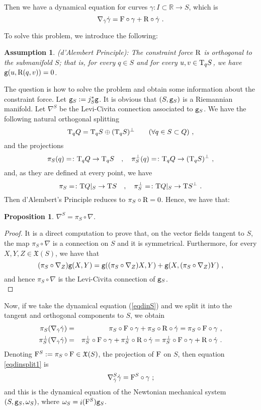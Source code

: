 \documentclass[12pt]{report}
\newtheorem{prop}[teor]{Proposition}
\newtheorem{assump}[teor]{Assumption}
\def\beq{\begin{equation}}
\def\eeq{\end{equation}}
\def\bea{\begin{eqnarray}}
\def\eea{\end{eqnarray}}
\def\qed{\ifvmode\removelastskip\fi
{\unskip\nobreak\hfil\penalty50\hbox{}\nobreak\hfil
\hbox{\vrule height1.2ex width1.2ex}\parfillskip=0pt
\finalhyphendemerits=0 \par\smallskip}}
\def\vf{\mathfrak X}
\def\Real{\mathbb{R}}
\def\Tan{{\rm T}}
\def\inn{\mathop{i}\nolimits}
\begin{document}
Then we have a dynamical equation for curves
$\gamma\colon I\subset\Real\to S$, which is
\beq
\nabla_{\dot\gamma}\dot\gamma ={\rm F}\circ\gamma+{\rm R}\circ\dot\gamma \ .
\label{eqdinS}
\eeq

To solve this problem, we introduce the following:

\begin{assump}
{\rm (d'Alembert Principle}):
The constraint force ${\rm R}$ is orthogonal to the submanifold $S$;
that is, for every $q\in S$ and for every $ u,v\in\Tan_qS$, we have  ${\tt g}(u,{\rm R}(q,v))=0$.
\end{assump}

The question is how to solve the problem and obtain some information about the constraint force.
Let ${\tt g}_S:=j_S^*{\tt g}$. It is obvious that $(S,{\tt g}_S)$ is a Riemannian manifold.
Let $\nabla^S$ be the Levi-Civita connection associated to ${\tt g}_S$.
We have the following natural orthogonal splitting 
$$
\Tan_qQ=\Tan_qS\oplus (\Tan_qS)^\perp \qquad (\forall q\in S\subset Q) \ ,
$$
and the projections
$$
\pi_S(q)=\colon \Tan_qQ\rightarrow\Tan_qS
\quad , \quad
\pi^\perp_S(q)=\colon \Tan_qQ\rightarrow (\Tan_qS)^\perp \ ,
$$
and, as they are defined at every point, we have
$$
\pi_S=\colon \Tan Q\vert_S\rightarrow\Tan S
\quad , \quad
\pi^\perp_S=\colon \Tan Q\vert_S\rightarrow \Tan S^\perp \ .
$$
Then d'Alembert's Principle reduces to $\pi_S\circ{\rm R}=0$.
Hence, we have that:

\begin{prop}
$\nabla^S=\pi_S\circ\nabla$.
\end{prop}
\begin{proof}
It is a direct computation to prove that, on the vector fields tangent to $S$, the map $\pi_S\circ\nabla$ is a connection on $S$ and it is symmetrical. 
Furthermore, for every $X,Y,Z\in\vf (S)$, we have that
$$
(\pi_S\circ\nabla_Z){\tt g}(X,Y)={\tt g}((\pi_S\circ\nabla_Z)X,Y)+{\tt g}(X,(\pi_S\circ\nabla_Z)Y) \ ,
$$
and hence $\pi_S\circ\nabla$ is the Levi-Civita connection of ${\tt g}_S$.
\\ \qed \end{proof}

Now, if we take the dynamical equation (\ref{eqdinS}) and we split it into the tangent and orthogonal  components to $S$, we obtain
\bea
\pi_S(\nabla_{\dot\gamma}\dot\gamma) &=&
\pi_S\circ{\rm F}\circ\gamma+\pi_S\circ{\rm R}\circ\dot\gamma =
\pi_S\circ{\rm F}\circ\gamma \ ,
\label{eqdinsplit1}  \\
\pi_S^\perp(\nabla_{\dot\gamma}\dot\gamma) &=&
\pi_S^\perp\circ{\rm F}\circ\gamma+\pi_S^\perp\circ{\rm R}\circ\dot\gamma =
\pi_S^\perp\circ{\rm F}\circ\gamma +{\rm R}\circ\dot\gamma \ .
\label{eqdinsplit2}
\eea
Denoting ${\rm F}^S:=\pi_S\circ{\rm F}\in\vf (S)$, the projection of
 ${\rm F}$ on $S$, then equation \eqref{eqdinsplit1} is 
 \beq
 \nabla^S_{\dot\gamma}\dot\gamma = {\rm F}^S\circ\gamma \ ;
\label{eqdinresS}
\eeq
and this is the dynamical equation of the Newtonian mechanical system
$(S,{\tt g}_S,\omega_S)$, where $\omega_S=\inn({\rm F}^S){\tt g}_S$.
\end{document}

